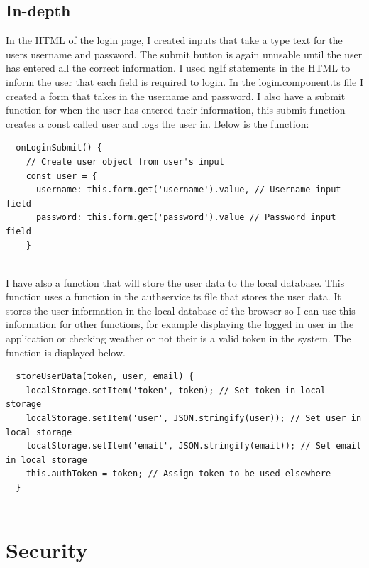 \subsection{In-depth}
In the HTML of the login page, I created inputs that take a type text for the users username and password. The submit button is again unusable until the user has entered all the correct information. I used ngIf statements in the HTML to inform the user that each field is required to login. In the login.component.ts file I created a form that takes in the username and password. I also have a submit function for when the user has entered their information, this submit function creates a const called user and logs the user in. Below is the function:


\begin{lstlisting}
  onLoginSubmit() {
    // Create user object from user's input
    const user = {
      username: this.form.get('username').value, // Username input field
      password: this.form.get('password').value // Password input field
    }
  
\end{lstlisting}
I have also a function that will store the user data to the local database. This function uses a function in the authservice.ts file that stores the user data. It stores the user information in the local database of the browser so I can use this information for other functions, for example displaying the logged in user in the application or checking weather or not their is a valid token in the system. The function is displayed below.
\begin{lstlisting}
  storeUserData(token, user, email) {
    localStorage.setItem('token', token); // Set token in local storage
    localStorage.setItem('user', JSON.stringify(user)); // Set user in local storage
    localStorage.setItem('email', JSON.stringify(email)); // Set email in local storage
    this.authToken = token; // Assign token to be used elsewhere
  }
  
\end{lstlisting}

\section{Security}

